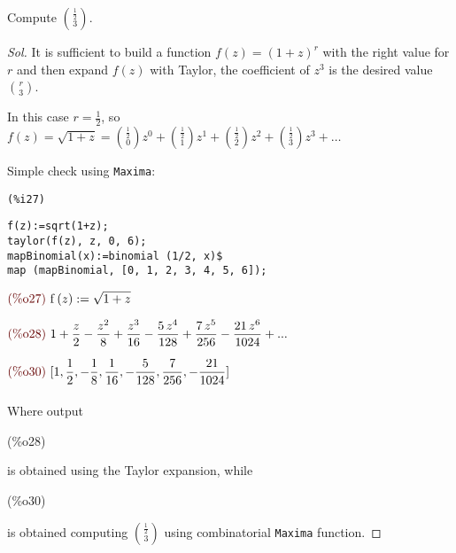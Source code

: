 \begin{exercise}
  \label{exercise:first-on-comb-with-real}
  Compute ${{ \frac{1}{2} }\choose{3}} $.
\end{exercise}
\begin{proof}[Sol]
  It is sufficient to build a function $f(z) = (1+z)^r$ with the right
  value for $r$ and then expand $f(z)$ with Taylor, the coefficient of
  $z^3$ is the desired value ${{ r }\choose{3}} $.

  In this case $r= \frac{1}{2} $, so $f(z) = \sqrt{1+z} =
  {{\frac{1}{2}}\choose{0}}z^0 + {{\frac{1}{2}}\choose{1}}z^1 +
  {{\frac{1}{2}}\choose{2}}z^2 + {{\frac{1}{2}}\choose{3}}z^3 + \ldots$

  Simple check using \texttt{Maxima}:

\noindent
\begin{minipage}[t]{8ex}{\color{red}\bf
\begin{verbatim}
(%i27)
\end{verbatim}}
\end{minipage}
\begin{minipage}[t]{\textwidth}{\color{blue}
\begin{verbatim}
f(z):=sqrt(1+z);
taylor(f(z), z, 0, 6);
mapBinomial(x):=binomial (1/2, x)$
map (mapBinomial, [0, 1, 2, 3, 4, 5, 6]);
\end{verbatim}}
\end{minipage}
\begin{math}\displaystyle
\parbox{8ex}{\color{labelcolor}(\%o27) }
\mathrm{f}\left( z\right) :=\sqrt{1+z}
\end{math}

\begin{math}\displaystyle
\parbox{8ex}{\color{labelcolor}(\%o28) }
1+\frac{z}{2}-\frac{{z}^{2}}{8}+\frac{{z}^{3}}{16}-\frac{5\,{z}^{4}}{128}+\frac{7\,{z}^{5}}{256}-\frac{21\,{z}^{6}}{1024}+...
\end{math}

\begin{math}\displaystyle
\parbox{8ex}{\color{labelcolor}(\%o30) }
[1,\frac{1}{2},-\frac{1}{8},\frac{1}{16},-\frac{5}{128},\frac{7}{256},-\frac{21}{1024}]
\end{math}
\\\\
Where output \parbox{8ex}{\color{labelcolor}(\%o28) } is obtained
using the Taylor expansion,
while \parbox{8ex}{\color{labelcolor}(\%o30) } is obtained computing
${{ \frac{1}{2} }\choose{3}} $ using combinatorial \texttt{Maxima}
function.
\end{proof}

